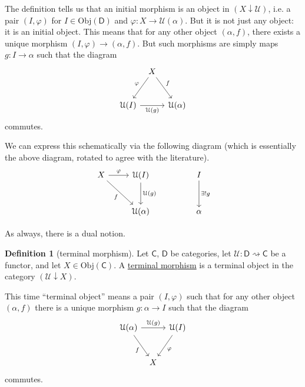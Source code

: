 \documentclass[a4paper,10pt]{scrreprt}
\newcommand{\defn}[1]{\ul{#1}}
\newcommand{\Obj}{\mathrm{Obj}}
\theoremstyle{definition}
\newtheorem{definition}{Definition}[section]
\theoremstyle{plain}
\theoremstyle{remark}
\begin{document}
The definition tells us that an initial morphism is an object in $(X \downarrow \mathcal{U})$, i.e. a pair $(I, \varphi)$ for $I \in \Obj(\mathsf{D})$ and $\varphi\colon X \to \mathcal{U}(\alpha)$. But it is not just any object: it is an initial object. This means that for any other object $(\alpha, f)$, there exists a unique morphism $(I, \varphi) \to (\alpha, f)$.
But such morphisms are simply maps $g\colon I \to \alpha$ such that the diagram
\begin{equation*}
  \begin{tikzcd}[column sep=tiny, row sep=6ex]
    & X \arrow[dl, swap, "\varphi"] \arrow[dr, "f"] & \\
    \mathcal{U}(I) \arrow[rr, swap, "\mathcal{U}(g)"] & & \mathcal{U}(\alpha)
  \end{tikzcd}
\end{equation*}
commutes.

We can express this schematically via the following diagram (which is essentially the above diagram, rotated to agree with the literature).
\begin{equation*}
  \begin{tikzcd}[row sep=large]
    X \arrow[r, "\varphi"] \arrow[dr, swap, "f"] & \mathcal{U}(I) \arrow[d, "\mathcal{U}(g)"] & & I \arrow[d, "\exists!g"]\\
    & \mathcal{U}(\alpha) & & \alpha
  \end{tikzcd}
\end{equation*}

As always, there is a dual notion.
\begin{definition}[terminal morphism]
  \label{def:terminalmorphism}
  Let $\mathsf{C}$, $\mathsf{D}$ be categories, let $\mathcal{U}\colon \mathsf{D} \rightsquigarrow \mathsf{C}$ be a functor, and let $X \in \Obj(\mathsf{C})$. A \defn{terminal morphism} is a terminal object in the category $(\mathcal{U} \downarrow X)$.
\end{definition}

This time ``terminal object'' means a pair $(I, \varphi)$ such that for any other object $(\alpha, f)$ there is a unique morphism $g\colon \alpha \to I$ such that the diagram
\begin{equation*}
  \begin{tikzcd}[column sep=tiny, row sep=6ex]
    \mathcal{U}(\alpha) \arrow[dr, swap, "f"] \arrow[rr, "\mathcal{U}(g)"] & & \mathcal{U}(I)\arrow[dl, "\varphi"] \\
    & X 
  \end{tikzcd}
\end{equation*}
commutes.
\end{document}
